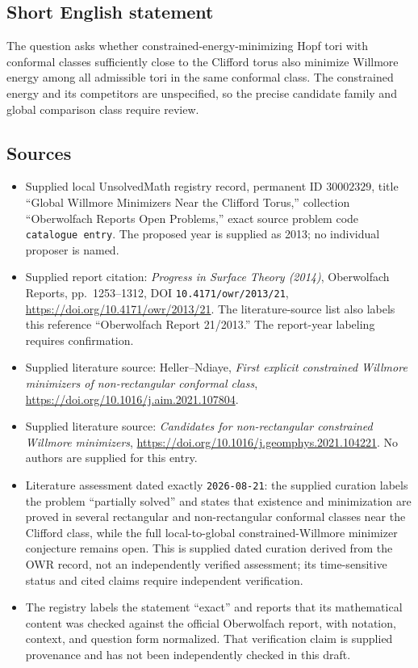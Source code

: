 \documentclass[11pt]{article}
\begin{document}
\subsection{Short English statement}
The question asks whether constrained-energy-minimizing Hopf tori with conformal classes sufficiently close to the Clifford torus also minimize Willmore energy among all admissible tori in the same conformal class. The constrained energy and its competitors are unspecified, so the precise candidate family and global comparison class require review.
\subsection{Sources}
\begin{itemize}
\item Supplied local UnsolvedMath registry record, permanent ID \(30002329\), title ``Global Willmore Minimizers Near the Clifford Torus,'' collection ``Oberwolfach Reports Open Problems,'' exact source problem code \texttt{catalogue entry}. The proposed year is supplied as 2013; no individual proposer is named.
\item Supplied report citation: \emph{Progress in Surface Theory (2014)}, Oberwolfach Reports, pp.\ 1253--1312, DOI \texttt{10.4171/owr/2013/21}, \url{https://doi.org/10.4171/owr/2013/21}. The literature-source list also labels this reference ``Oberwolfach Report 21/2013.'' The report-year labeling requires confirmation.
\item Supplied literature source: Heller--Ndiaye, \emph{First explicit constrained Willmore minimizers of non-rectangular conformal class}, \url{https://doi.org/10.1016/j.aim.2021.107804}.
\item Supplied literature source: \emph{Candidates for non-rectangular constrained Willmore minimizers}, \url{https://doi.org/10.1016/j.geomphys.2021.104221}. No authors are supplied for this entry.
\item Literature assessment dated exactly \texttt{2026-08-21}: the supplied curation labels the problem ``partially solved'' and states that existence and minimization are proved in several rectangular and non-rectangular conformal classes near the Clifford class, while the full local-to-global constrained-Willmore minimizer conjecture remains open. This is supplied dated curation derived from the OWR record, not an independently verified assessment; its time-sensitive status and cited claims require independent verification.
\item The registry labels the statement ``exact'' and reports that its mathematical content was checked against the official Oberwolfach report, with notation, context, and question form normalized. That verification claim is supplied provenance and has not been independently checked in this draft.
\end{itemize}
\end{document}
